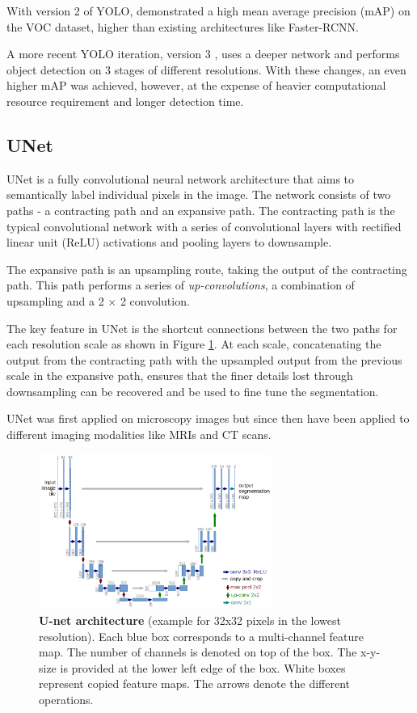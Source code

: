 \documentclass[journal]{IEEEtran}
\begin{document}
With version 2 of YOLO, \cite{redmon2016yolo9000} demonstrated a high mean average precision (mAP) on the VOC dataset, higher than existing architectures like Faster-RCNN.

A more recent YOLO iteration, version 3 \cite{yolov3}, uses a deeper network and performs object detection on 3 stages of different resolutions. With these changes, an even higher mAP was achieved, however, at the expense of heavier computational resource requirement and longer detection time.
\subsection{UNet}
UNet\cite{RFB15a} is a fully convolutional neural network architecture that aims to semantically label individual pixels in the image. The network consists of two paths - a contracting path and an expansive path. The contracting path is the typical convolutional network with a series of convolutional layers with rectified linear unit (ReLU) activations and pooling layers to downsample.

The expansive path is an upsampling route, taking the output of the contracting path. This path performs a series of \textit{up-convolutions}, a combination of upsampling and a 2 $\times$ 2 convolution.

The key feature in UNet is the shortcut connections between the two paths for each resolution scale as shown in Figure \ref{fig:unet}. At each scale, concatenating the output from the contracting path with the upsampled output from the previous scale in the expansive path, ensures that the finer details lost through downsampling can be recovered and be used to fine tune the segmentation.

UNet was first applied on microscopy images but since then have been applied to different imaging modalities like MRIs and CT scans.
\begin{figure}
\centering
\includegraphics[width=3in]{unet.png}
\caption{\textbf{U-net architecture} \cite{RFB15a} (example for 32x32 pixels in the lowest resolution). Each blue
box corresponds to a multi-channel feature map. The number of channels is denoted
on top of the box. The x-y-size is provided at the lower left edge of the box. White
boxes represent copied feature maps. The arrows denote the different operations.}
\label{fig:unet}
\end{figure}
\end{document}
